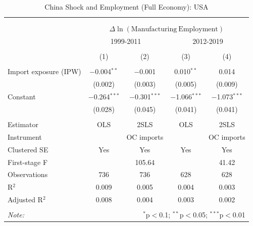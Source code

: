 
\begin{table}[!htbp] \centering 
  \caption{China Shock and Employment (Full Economy): USA} 
  \label{tab:usa_china_full} 
\begin{tabular}{@{\extracolsep{5pt}}lcccc} 
\\[-1.8ex]\hline 
\hline \\[-1.8ex] 
\\[-1.8ex] & \multicolumn{4}{c}{$\Delta \ln(\mathrm{Manufacturing\ Employment})$} \\ 
 & \multicolumn{2}{c}{1999-2011} & \multicolumn{2}{c}{2012-2019} \\ 
\\[-1.8ex] & (1) & (2) & (3) & (4)\\ 
\hline \\[-1.8ex] 
 Import exposure (IPW) & $-$0.004$^{**}$ & $-$0.001 & 0.010$^{**}$ & 0.014 \\ 
  & (0.002) & (0.003) & (0.005) & (0.009) \\ 
  Constant & $-$0.264$^{***}$ & $-$0.301$^{***}$ & $-$1.066$^{***}$ & $-$1.073$^{***}$ \\ 
  & (0.028) & (0.045) & (0.041) & (0.041) \\ 
 \hline \\[-1.8ex] 
Estimator & OLS & 2SLS & OLS & 2SLS \\ 
Instrument &  & OC imports &  & OC imports \\ 
Clustered SE & Yes & Yes & Yes & Yes \\ 
First-stage F &  & 105.64 &  & 41.42 \\ 
Observations & 736 & 736 & 628 & 628 \\ 
R$^{2}$ & 0.009 & 0.005 & 0.004 & 0.003 \\ 
Adjusted R$^{2}$ & 0.008 & 0.004 & 0.003 & 0.002 \\ 
\hline 
\hline \\[-1.8ex] 
\textit{Note:}  & \multicolumn{4}{r}{$^{*}$p$<$0.1; $^{**}$p$<$0.05; $^{***}$p$<$0.01} \\ 
\end{tabular} 
\end{table} 
